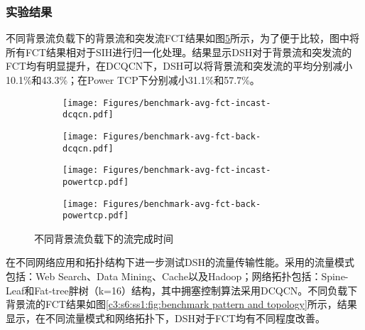 \subsubsection{实验结果}

不同背景流负载下的背景流和突发流FCT结果如图\ref{c3:s6:ss1:fig:benchmark fct}所示，为了便于比较，图中将所有FCT结果相对于SIH进行归一化处理。结果显示DSH对于背景流和突发流的FCT均有明显提升，在DCQCN下，DSH可以将背景流和突发流的平均分别减小10.1\%和43.3\%；在Power TCP下分别减小31.1\%和57.7\%。

\begin{figure}[H]
  \begin{subfigure}[b]{0.49\linewidth}
      \centering
      \texttt{[image: Figures/benchmark-avg-fct-incast-dcqcn.pdf]}
      \label{c3:s6:ss1:fig:sub1:benchmark fct burst dcqcn}
  \end{subfigure}
  \begin{subfigure}[b]{0.49\linewidth}
      \centering
      \texttt{[image: Figures/benchmark-avg-fct-back-dcqcn.pdf]}
      \label{c3:s6:ss1:fig:sub2:benchmark fct back dcqcn}
  \end{subfigure}
  \begin{subfigure}[b]{0.49\linewidth}
    \centering
    \texttt{[image: Figures/benchmark-avg-fct-incast-powertcp.pdf]}
    \label{c3:s6:ss1:fig:sub1:benchmark fct burst powertcp}
  \end{subfigure}
  \begin{subfigure}[b]{0.49\linewidth}
    \centering
    \texttt{[image: Figures/benchmark-avg-fct-back-powertcp.pdf]}
    \label{c3:s6:ss1:fig:sub1:throughput of f0 powertcp}
  \end{subfigure} 
  \caption{不同背景流负载下的流完成时间}
  \label{c3:s6:ss1:fig:benchmark fct}
\end{figure}

在不同网络应用和拓扑结构下进一步测试DSH的流量传输性能。采用的流量模式包括：Web Search\cite{SIGCOMM10DCTCP}、Data Mining\cite{SIGCOMM09VL2}、Cache\cite{SIGCOMM15FB}以及Hadoop\cite{SIGCOMM15FB}；网络拓扑包括：Spine-Leaf和Fat-tree胖树\cite{al2008scalable}（k=16）结构，其中拥塞控制算法采用DCQCN。不同负载下背景流的FCT结果如图\ref{c3:s6:ss1:fig:benchmark pattern and topology}所示，结果显示，在不同流量模式和网络拓扑下，DSH对于FCT均有不同程度改善。

